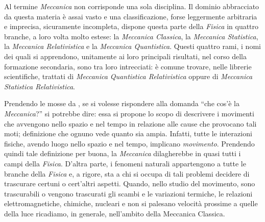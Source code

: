 \def\thesection {\arabic{section}}

\noindent Al termine {\em Meccanica} non corrisponde una sola disciplina. Il dominio
abbracciato da questa materia \`e assai vasto e una classificazione, forse leggermente
arbitraria e imprecisa, sicuramente incompleta,
dispone questa parte della {\em Fisica} in quattro branche, a loro volta molto estese:
la {\em Meccanica Classica}, la {\em Meccanica Statistica},
la {\em Meccanica Relativistica} e la {\em Meccanica Quantistica}. Questi quattro rami,
i nomi dei quali si apprendono, unitamente ai loro principali risultati,
nel corso della formazione
secondaria, sono tra loro intrecciati: \`e comune trovare, nelle librerie
scientifiche, trattati di {\em Meccanica Quantistica Relativistica}
oppure di {\em Meccanica Statistica  Relativistica}.

\noindent Prendendo le mosse da \cite{finzi},
se si volesse rispondere alla domanda ``che cos'\`e la {\em Meccanica}?''
 si potrebbe dire:
essa si propone lo scopo di descrivere i movimenti che avvengono nello spazio e nel
tempo in relazione alle cause che provocano tali moti; 
definizione che ognuno vede quanto sia ampia. Infatti, tutte
le interazioni fisiche, avendo luogo
nello spazio e nel tempo, implicano {\em movimento}. Prendendo quindi tale definizione
per  buona, la {\em Meccanica} dilagherebbe in quasi tutti i campi della {\em Fisica}. 
D'altra parte, i fenomeni naturali appartengono a tutte le branche della {\em Fisica} e,
a rigore, sta a chi si occupa di tali problemi decidere di trascurare
certuni o cert'altri aspetti. 
Quando, nello studio del movimento, sono trascurabili o vengono trascurati
gli scambi e le variazioni termiche, le relazioni elettromagnetiche,
chimiche, nucleari e non si palesano velocit\`a prossime a quelle della luce
ricadiamo, in generale, 
nell'ambito della Meccanica Classica.

